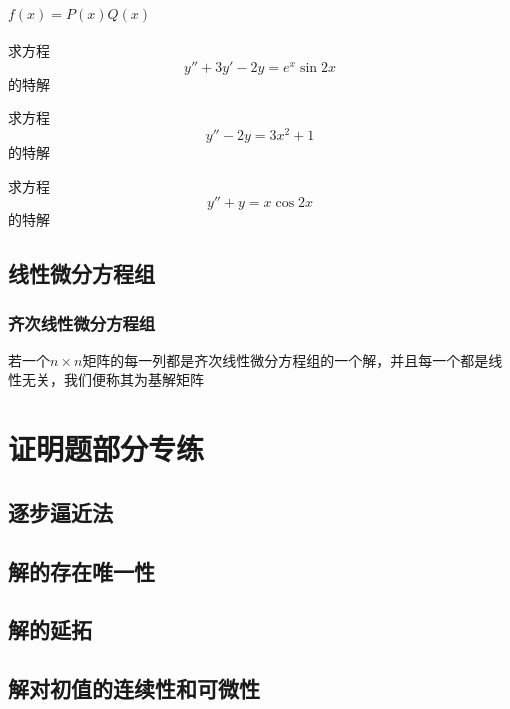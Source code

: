 \documentclass[lang=cn,14pt]{elegantbook}
\begin{document}
	\subsubsection{$f(x)=P(x)Q(x)$}
	\begin{example}
		求方程
		\begin{equation*}
			y''+3y'-2y=e^{x}\sin 2x
		\end{equation*}
		的特解
	\end{example}
	\vspace{2cm}
		\begin{example}
		求方程
		\begin{equation*}
			y''-2y=3x^2+1
		\end{equation*}
		的特解
	\end{example}
	\vspace{2cm}
	\begin{example}
		求方程
		\begin{equation*}
			y''+y=x\cos 2x
		\end{equation*}
		的特解
	\end{example}
	\vspace{2cm}
	\section{线性微分方程组}
	\subsection{齐次线性微分方程组}
	\begin{definition}[基解矩阵]
		若一个$n\times n$矩阵的每一列都是齐次线性微分方程组的一个解，并且每一个都是线性无关，我们便称其为基解矩阵
	\end{definition}
	\chapter{证明题部分专练} 
	\section{逐步逼近法}
	 \section{解的存在唯一性}                                               \section{解的延拓}
	\section{解对初值的连续性和可微性}                                                                                                                                                                                                                                                                                                                                                                                                                                           
\end{document}
